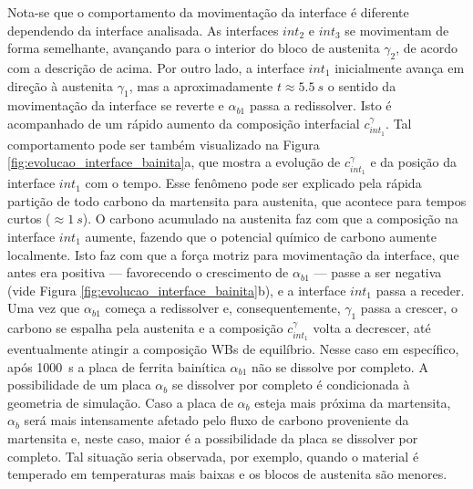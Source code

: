 Nota-se que o comportamento da movimentação da interface é diferente dependendo da interface analisada. As interfaces $int_2$ e $int_3$ se movimentam de forma semelhante, avançando para o interior do bloco de austenita $\gamma_2$, de acordo com a descrição de acima. Por outro lado, a interface $int_1$ inicialmente avança em direção à austenita $\gamma_1$, mas a aproximadamente $t \approx \SI{5.5}{s}$ o sentido da movimentação da interface se reverte e $\alpha_{b1}$ passa a redissolver. Isto é acompanhado de um rápido aumento da composição interfacial $c^\gamma_{int_1}$. Tal comportamento pode ser também visualizado na Figura \ref{fig:evolucao_interface_bainita}a, que mostra a evolução de $c^\gamma_{int_1}$ e da posição da interface $int_1$ com o tempo. Esse fenômeno pode ser explicado pela rápida partição de todo carbono da martensita para austenita, que acontece para tempos curtos ($\approx \SI{1}{s}$). O carbono acumulado na austenita faz com que a composição na interface $int_1$ aumente, fazendo que o potencial químico de carbono aumente localmente. Isto faz com que a força motriz para movimentação da interface, que antes era positiva --- favorecendo o crescimento de $\alpha_{b1}$ --- passe a ser negativa (vide Figura \ref{fig:evolucao_interface_bainita}b), e a interface $int_1$ passa a receder. Uma vez que $\alpha_{b1}$ começa a redissolver e, consequentemente, $\gamma_1$ passa a crescer, o carbono se espalha pela austenita e a composição $c^\gamma_{int_1}$ volta a decrescer, até eventualmente atingir a composição WBs de equilíbrio. Nesse caso em específico, após 1000~s a placa de ferrita bainítica $\alpha_{b1}$ não se dissolve por completo. A possibilidade de um placa $\alpha_b$ se dissolver por completo é condicionada à geometria de simulação. Caso a placa de $\alpha_b$ esteja mais próxima da martensita, $\alpha_b$ será mais intensamente afetado pelo fluxo de carbono proveniente da martensita e, neste caso, maior é a possibilidade da placa se dissolver por completo. Tal situação seria observada, por exemplo, quando o material é temperado em temperaturas mais baixas e os blocos de austenita são menores.


